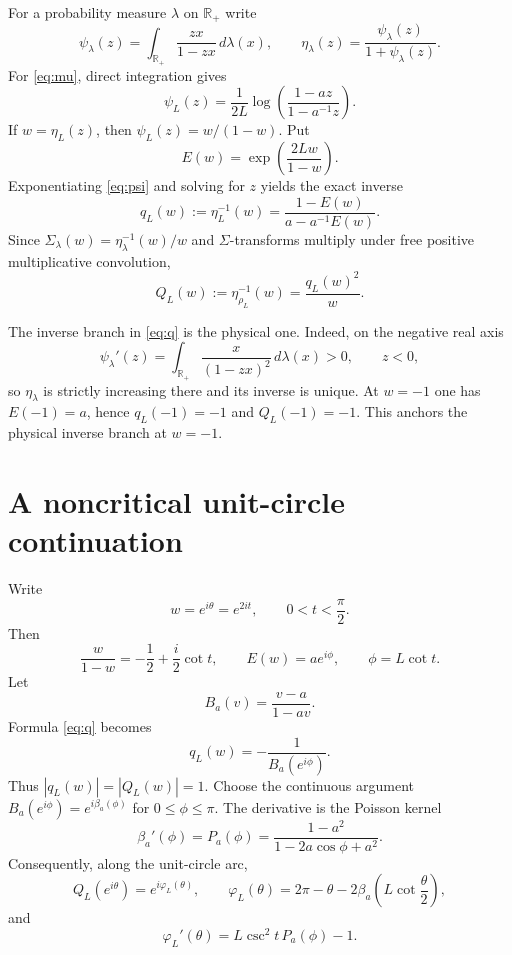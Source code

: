 \documentclass[11pt]{article}
\newcommand{\R}{\mathbb R}
\begin{document}
For a probability measure $\lambda$ on $\R_+$ write
\[
 \psi_\lambda(z)=\int_{\R_+}\frac{zx}{1-zx}\,d\lambda(x),
 \qquad
 \eta_\lambda(z)=\frac{\psi_\lambda(z)}{1+\psi_\lambda(z)}.
\]
For \eqref{eq:mu}, direct integration gives
\begin{equation}\label{eq:psi}
 \psi_L(z)=\frac{1}{2L}\log\!\left(\frac{1-az}{1-a^{-1}z}\right).
\end{equation}
If $w=\eta_L(z)$, then $\psi_L(z)=w/(1-w)$.  Put
\[
 E(w)=\exp\!\left(\frac{2Lw}{1-w}\right).
\]
Exponentiating \eqref{eq:psi} and solving for $z$ yields the exact inverse
\begin{equation}\label{eq:q}
 q_L(w):=\eta_L^{-1}(w)
   =\frac{1-E(w)}{a-a^{-1}E(w)}.
\end{equation}
Since $\Sigma_\lambda(w)=\eta_\lambda^{-1}(w)/w$ and $\Sigma$-transforms
multiply under free positive multiplicative convolution,
\begin{equation}\label{eq:Q}
 Q_L(w):=\eta_{\rho_L}^{-1}(w)=\frac{q_L(w)^2}{w}.
\end{equation}

The inverse branch in \eqref{eq:q} is the physical one.  Indeed, on the
negative real axis
\[
 \psi_\lambda'(z)=\int_{\R_+}\frac{x}{(1-zx)^2}\,d\lambda(x)>0,
 \qquad z<0,
\]
so $\eta_\lambda$ is strictly increasing there and its inverse is unique.
At $w=-1$ one has $E(-1)=a$, hence $q_L(-1)=-1$ and $Q_L(-1)=-1$.
This anchors the physical inverse branch at $w=-1$.

\section{A noncritical unit-circle continuation}

Write
\[
 w=e^{i\theta}=e^{2it},\qquad 0<t<\frac\pi2.
\]
Then
\[
 \frac{w}{1-w}=-\frac12+\frac{i}{2}\cot t,
 \qquad
 E(w)=a e^{i\phi},
 \qquad
 \phi=L\cot t.
\]
Let
\[
 B_a(v)=\frac{v-a}{1-av}.
\]
Formula \eqref{eq:q} becomes
\[
 q_L(w)=-\frac{1}{B_a(e^{i\phi})}.
\]
Thus $|q_L(w)|=|Q_L(w)|=1$.  Choose the continuous argument
$B_a(e^{i\phi})=e^{i\beta_a(\phi)}$ for $0\leq\phi\leq\pi$.
The derivative is the Poisson kernel
\[
 \beta_a'(\phi)=P_a(\phi)
 =\frac{1-a^2}{1-2a\cos\phi+a^2}.
\]
Consequently, along the unit-circle arc,
\begin{equation}\label{eq:phase}
 Q_L(e^{i\theta})=e^{i\varphi_L(\theta)},
 \qquad
 \varphi_L(\theta)=2\pi-\theta-2\beta_a\!\left(L\cot\frac\theta2\right),
\end{equation}
and
\begin{equation}\label{eq:phaseprime}
 \varphi_L'(\theta)
 =L\csc^2 t\,P_a(\phi)-1.
\end{equation}
\end{document}
